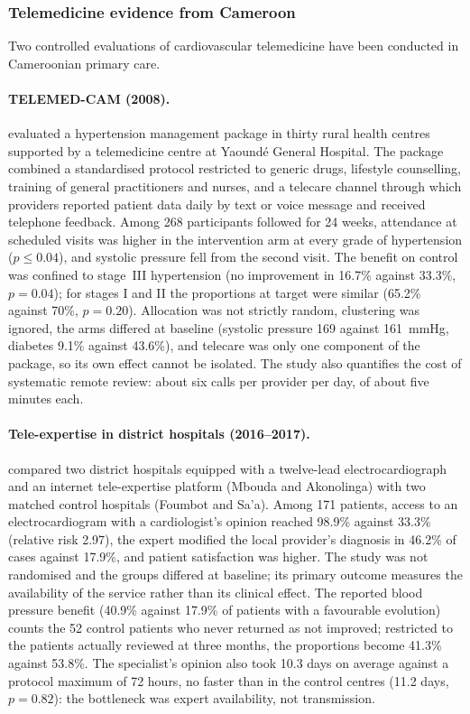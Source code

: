 \subsubsection{Telemedicine evidence from Cameroon}\label{sec:telemedcam}\label{sec:bediang}\label{sec:cameroon-joint}\label{sec:specialist-access}

Two controlled evaluations of cardiovascular telemedicine have been conducted in Cameroonian primary care.

\paragraph{TELEMED-CAM (2008).} \Textcite{kingue2013} evaluated a hypertension management package in thirty rural health centres supported by a telemedicine centre at Yaoundé General Hospital. The package combined a standardised protocol restricted to generic drugs, lifestyle counselling, training of general practitioners and nurses, and a telecare channel through which providers reported patient data daily by text or voice message and received telephone feedback. Among 268 participants followed for 24 weeks, attendance at scheduled visits was higher in the intervention arm at every grade of hypertension ($p \leq 0.04$), and systolic pressure fell from the second visit. The benefit on control was confined to stage~III hypertension (no improvement in 16.7\% against 33.3\%, $p = 0.04$); for stages I and II the proportions at target were similar (65.2\% against 70\%, $p = 0.20$). Allocation was not strictly random, clustering was ignored, the arms differed at baseline (systolic pressure 169 against 161~mmHg, diabetes 9.1\% against 43.6\%), and telecare was only one component of the package, so its own effect cannot be isolated. The study also quantifies the cost of systematic remote review: about six calls per provider per day, of about five minutes each.

\paragraph{Tele-expertise in district hospitals (2016--2017).} \Textcite{bediang2021} compared two district hospitals equipped with a twelve-lead electrocardiograph and an internet tele-expertise platform (Mbouda and Akonolinga) with two matched control hospitals (Foumbot and Sa'a). Among 171 patients, access to an electrocardiogram with a cardiologist's opinion reached 98.9\% against 33.3\% (relative risk 2.97), the expert modified the local provider's diagnosis in 46.2\% of cases against 17.9\%, and patient satisfaction was higher. The study was not randomised and the groups differed at baseline; its primary outcome measures the availability of the service rather than its clinical effect.\label{sec:bediang-appraisal} The reported blood pressure benefit (40.9\% against 17.9\% of patients with a favourable evolution) counts the 52 control patients who never returned as not improved; restricted to the patients actually reviewed at three months, the proportions become 41.3\% against 53.8\%. The specialist's opinion also took 10.3 days on average against a protocol maximum of 72 hours, no faster than in the control centres (11.2 days, $p = 0.82$): the bottleneck was expert availability, not transmission.

